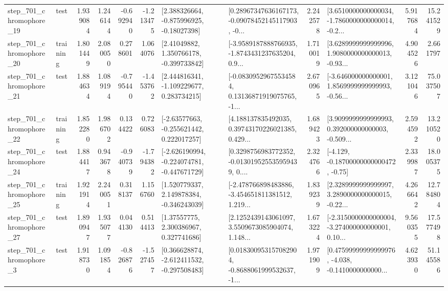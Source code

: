 \begin{tabular}{llrrrrllrlrr}
  step\_701\_chromophore\_19 &      test &      1.939084 &    1.246144 &     -0.692940 & -1.213475 &    [2.388326664, -0.875996925, -0.18027398] &  [0.28967347636167173, -0.09078452145117903, -0... &       2.242578 &  [3.6510000000000034, -1.7860000000000014, -0.2... &            5.917684 &         15.241529 \\
  step\_701\_chromophore\_20 &  training &      1.801449 &    2.080050 &      0.278601 &  1.064076 &     [2.41049882, 1.350766178, -0.399733842] &  [-3.9589187888766935, -1.8743431237635204, 0.9... &       1.710019 &  [3.6289999999999996, 1.9080000000000013, -0.93... &            4.904526 &          2.661797 \\
  step\_701\_chromophore\_21 &      test &      1.884634 &    1.089194 &     -0.795440 & -1.453762 &    [2.444816341, -1.109229677, 0.283734215] &  [-0.08309529675534584, 0.13136871919075765, -1... &       2.670965 &  [-3.646000000000001, 1.8569999999999993, -0.56... &            3.121046 &         75.037507 \\
  step\_701\_chromophore\_22 &  training &      1.852280 &    1.986702 &      0.134422 &  0.726083 &    [-2.63577663, -0.255621442, 0.222017257] &  [4.188137835492035, 0.39743170226021385, 0.429... &       1.689423 &  [3.9099999999999993, 0.392000000000003, -0.509... &            2.594592 &         13.210520 \\
  step\_701\_chromophore\_24 &      test &      1.884417 &    0.943678 &     -0.940739 & -1.794382 &  [-2.626190994, -0.224074781, -0.447671729] &  [0.3298756983772352, -0.013019525535959439, 0.... &       2.324766 &              [-4.129, -0.18700000000000472, -0.75] &            2.339987 &         18.005375 \\
  step\_701\_chromophore\_25 &  training &      1.921914 &    2.240051 &      0.318137 &  1.156760 &    [1.520779337, 2.149878384, -0.346243039] &  [-2.478766898483886, -3.454651811381512, 1.219... &       1.839239 &  [2.3289999999999997, 3.2890000000000015, -0.22... &            4.266642 &         12.784804 \\
  step\_701\_chromophore\_27 &      test &      1.890947 &    1.935077 &      0.044130 &  0.514413 &      [1.37557775, 2.300386967, 0.327741686] &  [2.1252439143061097, 3.5509673085904074, 1.148... &       1.673224 &  [-2.3150000000000004, -3.274000000000001, 0.10... &            9.560355 &         17.577498 \\
   step\_701\_chromophore\_3 &      test &      1.918730 &    1.091854 &     -0.826876 & -1.527457 &   [0.366628874, -2.612411532, -0.297508483] &  [0.018300953157082904, -0.8688061999532637, -1... &       1.971909 &  [0.47599999999999976, -4.038, -0.1410000000000... &            4.623930 &         51.145586 \\

\end{tabular}
